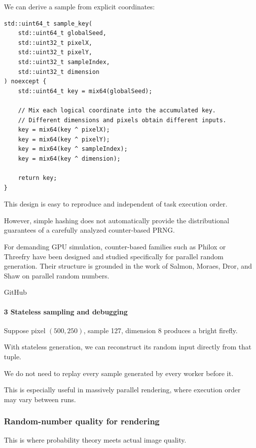 We can derive a sample from explicit coordinates:

\begin{verbatim}
std::uint64_t sample_key(
    std::uint64_t globalSeed,
    std::uint32_t pixelX,
    std::uint32_t pixelY,
    std::uint32_t sampleIndex,
    std::uint32_t dimension
) noexcept {
    std::uint64_t key = mix64(globalSeed);

    // Mix each logical coordinate into the accumulated key.
    // Different dimensions and pixels obtain different inputs.
    key = mix64(key ^ pixelX);
    key = mix64(key ^ pixelY);
    key = mix64(key ^ sampleIndex);
    key = mix64(key ^ dimension);

    return key;
}
\end{verbatim}

This design is easy to reproduce and independent of task execution order.

However, simple hashing does not automatically provide the distributional guarantees of a carefully analyzed counter-based PRNG.

For demanding GPU simulation, counter-based families such as Philox or Threefry have been designed and studied specifically for parallel random generation. Their structure is grounded in the work of Salmon, Moraes, Dror, and Shaw on parallel random numbers.

GitHub

\paragraph{3 Stateless sampling and debugging}\label{stateless-sampling-and-debugging}

Suppose pixel \((500,250)\), sample 127, dimension 8 produces a bright firefly.

With stateless generation, we can reconstruct its random input directly from that tuple.

We do not need to replay every sample generated by every worker before it.

This is especially useful in massively parallel rendering, where execution order may vary between runs.

\subsubsection{Random-number quality for rendering}\label{random-number-quality-for-rendering}

This is where probability theory meets actual image quality.

